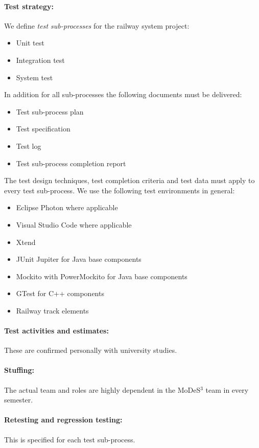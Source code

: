 \paragraph{Test strategy:} 
We define \textit{test sub-processes} for the railway system project:
\begin{itemize}
	\item Unit test
	\item Integration test
	\item System test
\end{itemize}
In addition for all sub-processes the following documents must be delivered:
\begin{itemize}
	\item Test sub-process plan
	\item Test specification
	\item Test log
	\item Test sub-process completion report
\end{itemize}
The test design techniques, test completion criteria and test data must apply to every test sub-process. We use the following test environments in general:
\begin{itemize}
	\item Eclipse Photon where applicable
	\item Visual Studio Code where applicable
	\item Xtend 
	\item JUnit Jupiter for Java base components
	\item Mockito with PowerMockito for Java base components
	\item GTest for C++ components
	\item Railway track elements
\end{itemize}
\paragraph{Test activities and estimates:} These are confirmed personally with university studies.
\paragraph{Stuffing:} The actual team and roles are highly dependent in the MoDeS$^3$ team in every semester.
\paragraph{Retesting and regression testing:} This is specified for each test sub-process.


